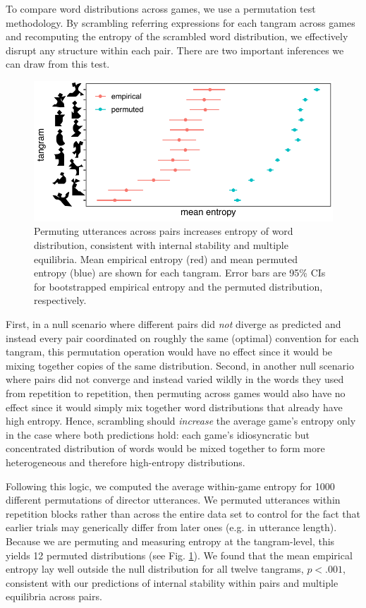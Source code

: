 \documentclass[alpha-refs]{wiley-article}
\begin{document}
To compare word distributions across games, we use a permutation test methodology.
By scrambling referring expressions for each tangram across games and recomputing the entropy of the scrambled word distribution, we effectively disrupt any structure within each pair.
There are two important inferences we can draw from this test.
\begin{figure}[t!]
\centering
\includegraphics[scale=.9]{permutedDiscrete.pdf}
\caption{Permuting utterances across pairs increases entropy of word distribution, consistent with internal stability and multiple equilibria. Mean empirical entropy (red) and mean permuted entropy (blue) are shown for each tangram. Error bars are 95\% CIs for bootstrapped empirical entropy and the permuted distribution, respectively.}
\label{fig:permuted}
\end{figure}
First, in a null scenario where different pairs did \emph{not} diverge as predicted and instead every pair coordinated on roughly the same (optimal) convention for each tangram, this permutation operation would have no effect since it would be mixing together copies of the same distribution.
Second, in another null scenario where pairs did not converge and instead varied wildly in the words they used from repetition to repetition, then permuting across games would also have no effect since it would simply mix together word distributions that already have high entropy.
Hence, scrambling should \emph{increase} the average game's entropy only in the case where both predictions hold: each game's idiosyncratic but concentrated distribution of words would be mixed together to form more heterogeneous and therefore high-entropy distributions.

Following this logic, we computed the average within-game entropy for 1000 different permutations of director utterances.
We permuted utterances within repetition blocks rather than across the entire data set to control for the fact that earlier trials may generically differ from later ones (e.g. in utterance length).
Because we are permuting and measuring entropy at the tangram-level, this yields 12 permuted distributions (see Fig. \ref{fig:permuted}).
We found that the mean empirical entropy lay well outside the null distribution for all twelve tangrams, $p < .001$, consistent with our predictions of internal stability within pairs and multiple equilibria across pairs.
\end{document}
